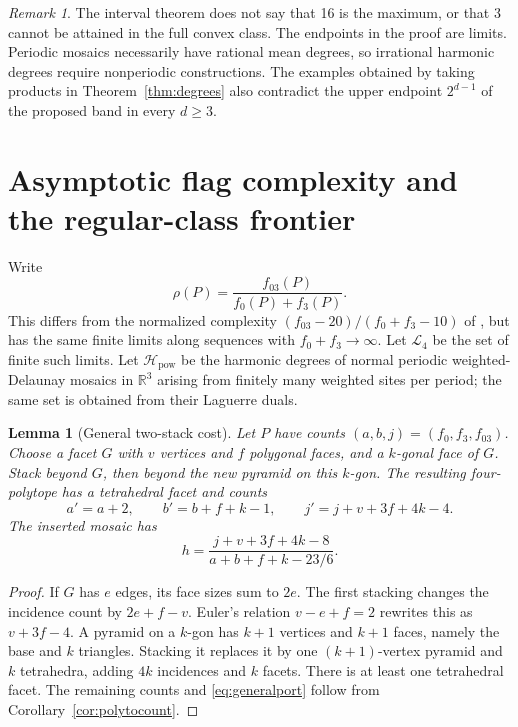 \documentclass[11pt,a4paper]{article}
\newtheorem{lemma}[theorem]{Lemma}
\theoremstyle{definition}\newtheorem{definition}[theorem]{Definition}
\theoremstyle{remark}\newtheorem{remark}[theorem]{Remark}
\newcommand{\R}{\mathbb R}\newcommand{\Z}{\mathbb Z}\newcommand{\conv}{\operatorname{conv}}
\begin{document}
\begin{remark}
The interval theorem does not say that 16 is the maximum, or that 3 cannot be attained in the full convex class. The endpoints in the proof are limits. Periodic mosaics necessarily have rational mean degrees, so irrational harmonic degrees require nonperiodic constructions. The examples obtained by taking products in Theorem~\ref{thm:degrees} also contradict the upper endpoint \(2^{d-1}\) of the proposed band in every \(d\ge3\).
\end{remark}

\section{Asymptotic flag complexity and the regular-class frontier}\label{sec:equivalence}
Write
\[
 \rho(P)=\frac{f_{03}(P)}{f_0(P)+f_3(P)}.
\]
This differs from the normalized complexity \((f_{03}-20)/(f_0+f_3-10)\) of \citet{Z02}, but has the same finite limits along sequences with \(f_0+f_3\to\infty\). Let \(\mathcal L_4\) be the set of finite such limits. Let \(\mathcal H_{\mathrm{pow}}\) be the harmonic degrees of normal periodic weighted-Delaunay mosaics in \(\R^3\) arising from finitely many weighted sites per period; the same set is obtained from their Laguerre duals.

\begin{lemma}[General two-stack cost]\label{lem:generalport}
Let \(P\) have counts \((a,b,j)=(f_0,f_3,f_{03})\). Choose a facet \(G\) with \(v\) vertices and \(f\) polygonal faces, and a \(k\)-gonal face of \(G\). Stack beyond \(G\), then beyond the new pyramid on this \(k\)-gon. The resulting four-polytope has a tetrahedral facet and counts
\[
 a'=a+2,\qquad b'=b+f+k-1,\qquad
 j'=j+v+3f+4k-4.
\]
The inserted mosaic has
\begin{equation}\label{eq:generalport}
 h=\frac{j+v+3f+4k-8}{a+b+f+k-23/6}.
\end{equation}
\end{lemma}
\begin{proof}
If \(G\) has \(e\) edges, its face sizes sum to \(2e\). The first stacking changes the incidence count by \(2e+f-v\). Euler's relation \(v-e+f=2\) rewrites this as \(v+3f-4\). A pyramid on a \(k\)-gon has \(k+1\) vertices and \(k+1\) faces, namely the base and \(k\) triangles. Stacking it replaces it by one \((k+1)\)-vertex pyramid and \(k\) tetrahedra, adding \(4k\) incidences and \(k\) facets. There is at least one tetrahedral facet. The remaining counts and \eqref{eq:generalport} follow from Corollary~\ref{cor:polytocount}.
\end{proof}
\end{document}
